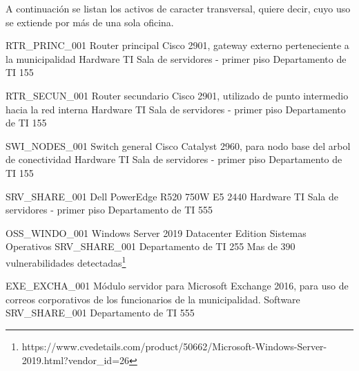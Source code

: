 A continuación se listan los activos de caracter transversal, quiere decir, cuyo uso se extiende por más de una sola oficina.

\informationResource
{RTR\_PRINC\_001}
{Router principal Cisco 2901, gateway externo perteneciente a la municipalidad}
{Hardware TI}
{Sala de servidores - primer piso}
{Departamento de TI}
{1}{5}{5}
{
	\threatResourceLost
	\threatHumanIntervention
	\threatRemoteIntervention
	\threatNaturalDisaster
	\threatHumanDisaster
}

\informationResource
{RTR\_SECUN\_001}
{Router secundario Cisco 2901, utilizado de punto intermedio hacia la red interna}
{Hardware TI}
{Sala de servidores - primer piso}
{Departamento de TI}
{1}{5}{5}
{
	\threatResourceLost
	\threatHumanIntervention
	\threatRemoteIntervention
	\threatNaturalDisaster
	\threatHumanDisaster
}

\informationResource
{SWI\_NODES\_001}
{Switch general Cisco Catalyst 2960, para nodo base del arbol de conectividad}
{Hardware TI}
{Sala de servidores - primer piso}
{Departamento de TI}
{1}{5}{5}
{
	\threatResourceLost
	\threatHumanIntervention
	\threatRemoteIntervention
	\threatNaturalDisaster
	\threatHumanDisaster
}

\informationResource
{SRV\_SHARE\_001}
{Dell PowerEdge R520 750W E5 2440}
{Hardware TI}
{Sala de servidores - primer piso}
{Departamento de TI}
{5}{5}{5}
{
	\threatHumanIntervention
	\threatRemoteIntervention
	\threatNaturalDisaster
	\threatHumanDisaster
	\threatInterest
}


\informationResource
{OSS\_WINDO\_001}
{Windows Server 2019 Datacenter Edition}
{Sistemas Operativos}
{SRV_SHARE_001}
{Departamento de TI}
{2}{5}{5}
{
	Mas de 390 vulnerabilidades detectadas\footnote{https://www.cvedetails.com/product/50662/Microsoft-Windows-Server-2019.html?vendor_id=26}\\
	\threatHumanIntervention
	\threatRemoteIntervention
}


\informationResource
{EXE\_EXCHA\_001}
{Módulo servidor para Microsoft Exchange 2016, para uso de correos corporativos de los funcionarios de la municipalidad.}
{Software}
{SRV_SHARE_001}
{Departamento de TI}
{5}{5}{5}
{
	\threatHumanIntervention
	\threatRemoteIntervention
	\threatInterest
}

